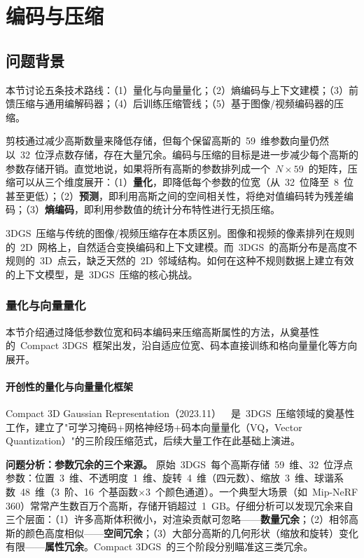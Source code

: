 \section{编码与压缩}
\label{sec:11_2}

\subsection{问题背景}

本节讨论五条技术路线：（1）量化与向量量化；（2）熵编码与上下文建模；（3）前馈压缩与通用编解码器；（4）后训练压缩管线；（5）基于图像/视频编码器的压缩。

剪枝通过减少高斯数量来降低存储，但每个保留高斯的~59~维参数向量仍然以~32~位浮点数存储，存在大量冗余。编码与压缩的目标是进一步减少每个高斯的参数存储开销。直觉地说，如果将所有高斯的参数排列成一个~$N \times 59$~的矩阵，压缩可以从三个维度展开：（1）\textbf{量化}，即降低每个参数的位宽（从~32~位降至~8~位甚至更低）；（2）\textbf{预测}，即利用高斯之间的空间相关性，将绝对值编码转为残差编码；（3）\textbf{熵编码}，即利用参数值的统计分布特性进行无损压缩。

3DGS~压缩与传统的图像/视频压缩存在本质区别。图像和视频的像素排列在规则的~2D~网格上，自然适合变换编码和上下文建模。而~3DGS~的高斯分布是高度不规则的~3D~点云，缺乏天然的~2D~邻域结构。如何在这种不规则数据上建立有效的上下文模型，是~3DGS~压缩的核心挑战。

\subsubsection{量化与向量量化}

本节介绍通过降低参数位宽和码本编码来压缩高斯属性的方法，从奠基性的~Compact 3DGS~框架出发，沿自适应位宽、码本直接训练和格向量量化等方向展开。

\paragraph{开创性的量化与向量量化框架}

Compact 3D Gaussian Representation（2023.11）~\cite{2311_13681}~是~3DGS~压缩领域的奠基性工作，建立了"可学习掩码+网格神经场+码本向量量化（VQ，Vector Quantization）"的三阶段压缩范式，后续大量工作在此基础上演进。

\textbf{问题分析：参数冗余的三个来源。}
原始~3DGS~每个高斯存储~59~维、32~位浮点参数：位置~3~维、不透明度~1~维、旋转~4~维（四元数）、缩放~3~维、球谐系数~48~维（3~阶、16~个基函数$\times$3~个颜色通道）。一个典型大场景（如~Mip-NeRF 360）常常产生数百万个高斯，存储开销超过~1~GB。仔细分析可以发现冗余来自三个层面：（1）许多高斯体积微小，对渲染贡献可忽略——\textbf{数量冗余}；（2）相邻高斯的颜色高度相似——\textbf{空间冗余}；（3）大部分高斯的几何形状（缩放和旋转）变化有限——\textbf{属性冗余}。Compact 3DGS~的三个阶段分别瞄准这三类冗余。

